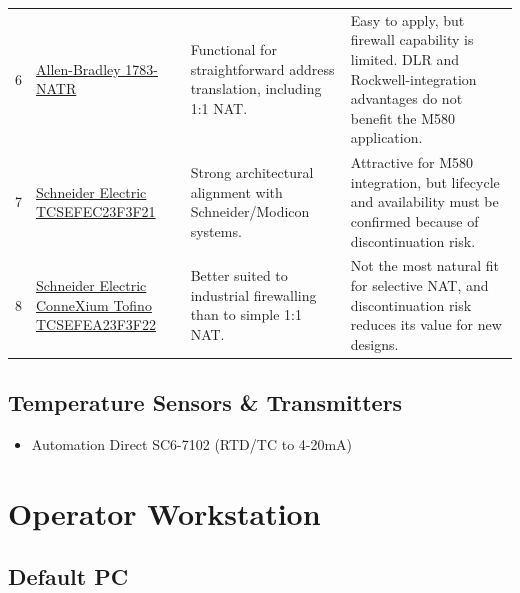 \begin{landscape}
\begin{footnotesize}
\begin{longtable}{@{}p{0.8cm}p{4.1cm}p{5.5cm}p{5.5cm}@{}}
6 & \href{https://www.rockwellautomation.com/en-us/products/hardware/allen-bradley/network-security-and-infrastructure/1783-natr.html}{Allen-Bradley 1783-NATR} & Functional for straightforward address translation, including 1:1 NAT. & Easy to apply, but firewall capability is limited. DLR and Rockwell-integration advantages do not benefit the M580 application. \\
7 & \href{https://www.se.com/ww/en/product/TCSEFEC23F3F21/}{Schneider Electric TCSEFEC23F3F21} & Strong architectural alignment with Schneider/Modicon systems. & Attractive for M580 integration, but lifecycle and availability must be confirmed because of discontinuation risk. \\
8 & \href{https://www.se.com/ww/en/product/TCSEFEA23F3F22/}{Schneider Electric ConneXium Tofino TCSEFEA23F3F22} & Better suited to industrial firewalling than to simple 1:1 NAT. & Not the most natural fit for selective NAT, and discontinuation risk reduces its value for new designs. \\
\bottomrule
\end{longtable}
\end{footnotesize}
\end{landscape}
\subsection{Temperature Sensors \& Transmitters}
\begin{itemize}
  \item Automation Direct SC6-7102 (RTD/TC to 4-20mA)
\end{itemize}

\section{Operator Workstation}
\subsection{Default PC}
